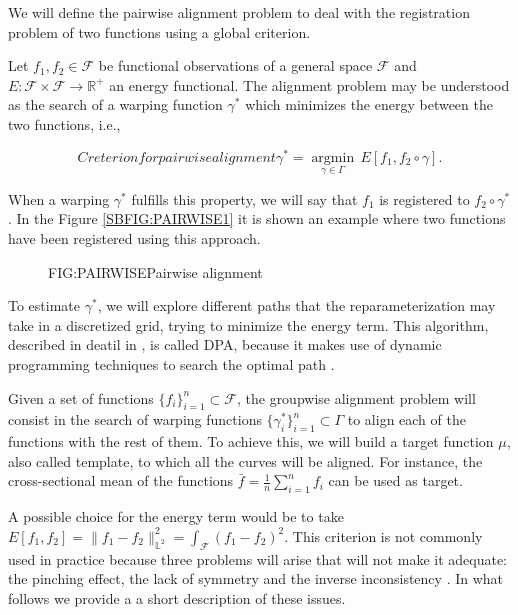 
We will define the pairwise alignment problem \cite{Srivastava2016} to deal with
the registration problem of two functions using a global criterion.

Let $f_1, f_2 \in \mathcal{F}$ be functional observations of a general space
$\mathcal{F}$ and $E: \mathcal{F} \times \mathcal{F} \rightarrow \mathbb{R}^+$ an energy
functional. The alignment problem may be understood as the search of a warping
function $\gamma^*$ which minimizes the energy between the two functions, i.e.,

\begin{equation}[EQ:ENERGY]{Creterion for pairwise alignment}
\gamma^* = \underset{\gamma \in \Gamma}{ \operatorname{argmin}} \, E[f_1, f_2 \circ \gamma].
\end{equation}

When a warping $\gamma^*$ fulfills this property, we will say that $f_1$ is
registered to $f_2 \circ \gamma^*$. In the Figure \ref{SBFIG:PAIRWISE1} it is
shown an example where two functions have been registered using this approach.

\begin{figure}[Pairwise alignment]{FIG:PAIRWISE}{Pairwise alignment}
	 \quad
\end{figure}

To estimate $\gamma^*$, we will explore different paths that the
reparameterization may take in a discretized grid, trying to minimize the energy
term. This algorithm, described in deatil in \cite{Srivastava2016}, is called \ac{DPA},
because it makes use of dynamic programming techniques to search the optimal
path \cite{dpa}.

Given a set of functions $\{f_i\}_{i=1}^n \subset \mathcal{F}$, the
groupwise alignment problem will consist in the search of warping functions
$\{\gamma_i^* \}_{i=1}^n \subset \Gamma$ to align each of the functions with the
rest of them. To achieve this, we will build a target function $\mu$, also
called template, to which all the curves will be aligned. For instance,
the cross-sectional mean of the functions $\bar f = \frac{1}{n}\sum_{i=1}^{n}f_i$
can be used as target.

A possible choice for the energy term would be to take
$E[f_1,f_2]= \|f_1 - f_2\|_{\mathbb{L}^2}^2=\int_\mathcal{F} (f_1 - f_2)^2$.
This criterion is not commonly used in practice because three
problems will arise that will not make it adequate: the pinching effect, the
lack of symmetry and the inverse inconsistency \cite{Marron2015}.
In what follows we provide a a short description of these issues.
